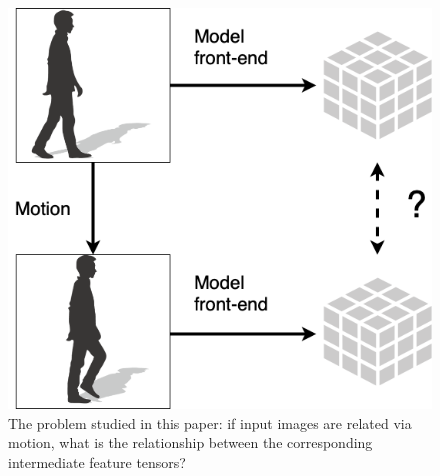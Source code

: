 \begin{figure}[htbp]
    \centering
    \includegraphics[width=0.6\linewidth]{img/video_latent_space_motion_analysis/motion_problem.png}
    \caption{The problem studied in this paper: if input images are related via motion, what is the relationship between the corresponding intermediate feature tensors?
    }
    \label{fig:video_latent_space_motion_analysis/overview}
\end{figure}

